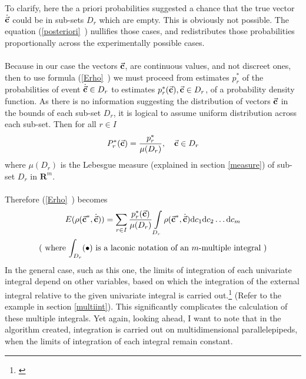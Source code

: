 To clarify, here the a priori probabilities suggested a chance that the true vector $\dot{\vec{\textbf{c}}}$ could be in sub-sets $D_{r}$ which are empty. This is obviously not possible. The equation (\vref{posteriori}~) nullifies those cases, and redistributes those probabilities proportionally across the experimentally possible cases.\\
\\
Because in our case the vectors $\vec{\textbf{c}}$, are continuous values, and not discreet ones, then to use formula (\vref{Erho}~) we must proceed from estimates $p_{r}^{*}$ of the probabilities of event $\dot{\vec{\textbf{c}}} \in D_{r}$ to estimates $p_{r}^{*}(\vec{\textbf{c}}), \vec{\textbf{c}} \in D_{r}$, of a probability density function. As there is no information suggesting the distribution of vectors $\vec{\textbf{c}}$ in the bounds of each sub-set $D_{r}$, it is logical to assume uniform distribution across each sub-set. Then for all $r \in I$
\begin{equation}
P_{r}^{*}(\vec{\textbf{c}})=\frac{p_{r}^{*}}{\mu(D_{r})}, \quad \vec{\textbf{c}} \in D_{r} \label{posteriori}
\end{equation}
where $\mu(D_{r})$ is the Lebesgue measure (explained in section \vref{measure}) of sub-set $D_{r}$ in $\boldsymbol{R}^{m}$. \\
\\
Therefore (\vref{Erho}~) becomes
\begin{gather}
E(\rho(\vec{\textbf{c}}^{*},\dot{\vec{\textbf{c}}}))=\sum\limits_{r \in I} \frac{p_{r}^{*}(\vec{\textbf{c}})}{\mu(D_{r})} \int\limits_{D_{r}}\rho(\vec{\textbf{c}}^{*},\dot{\vec{\textbf{c}}})\mathrm{d}c_{1}\mathrm{d}c_{2}\dots \mathrm{d}c_{m} \label{mathexpectancy}\\
\nonumber
\text{( where $\int_ {D_{r}}(\bullet)$ is a laconic notation of an $m$-multiple integral )}
\end{gather}
In the general case, such as this one, the limits of integration of each univariate integral depend on other variables, based on which the integration of the external integral relative to the given univariate integral is carried out.\footnote{\cite{stewart_2008_int}} (Refer to the example in section \vref{multiint}). This significantly complicates the calculation of these multiple integrals. Yet again, looking ahead, I want to note that in the algorithm created, integration is carried out on multidimensional parallelepipeds, when the limits of integration of each integral remain constant.

